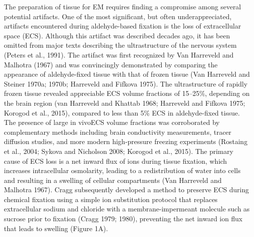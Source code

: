 \documentclass{article}
\begin{document}
The preparation of tissue for EM requires finding a compromise among several potential artifacts. One of the most significant, but often underappreciated, artifacts encountered during aldehyde-based fixation is the loss of extracellular space (ECS). Although this artifact was described decades ago, it has been omitted from major texts describing the ultrastructure of the nervous system (Peters et al., 1991). The artifact was first recognized by Van Harreveld and Malhotra (1967) and was convincingly demonstrated by comparing the appearance of aldehyde-fixed tissue with that of frozen tissue (Van Harreveld and Steiner 1970a; 1970b; Harreveld and Fifkova 1975). The ultrastructure of rapidly frozen tissue revealed appreciable ECS volume fractions of 15–25\%, depending on the brain region (van Harreveld and Khattab 1968; Harreveld and Fifkova 1975; Korogod et al., 2015), compared to less than 5\% ECS in aldehyde-fixed tissue. The presence of large in vivoECS volume fractions was corroborated by complementary methods including brain conductivity measurements, tracer diffusion studies, and more modern high-pressure freezing experiments (Rostaing et al., 2004; Sykova and Nicholson 2008; Korogod et al., 2015). The primary cause of ECS loss is a net inward flux of ions during tissue fixation, which increases intracellular osmolarity, leading to a redistribution of water into cells and resulting in a swelling of cellular compartments (Van Harreveld and Malhotra 1967). Cragg subsequently developed a method to preserve ECS during chemical fixation using a simple ion substitution protocol that replaces extracellular sodium and chloride with a membrane-impermeant molecule such as sucrose prior to fixation (Cragg 1979; 1980), preventing the net inward ion flux that leads to swelling (Figure 1A).
\end{document}
